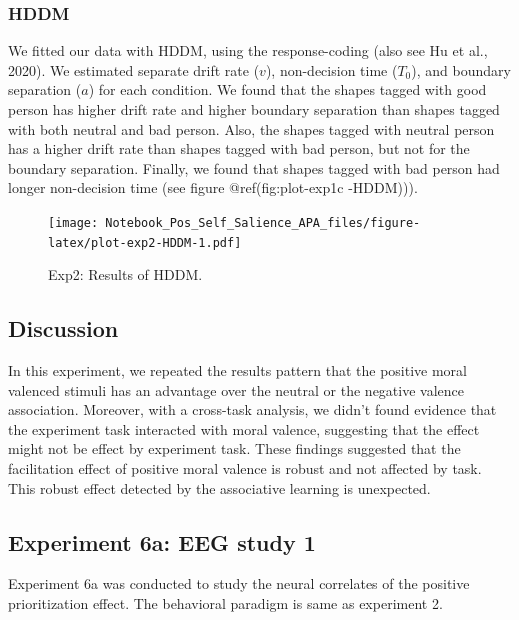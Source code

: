 \documentclass[
  english,
  man]{apa6}
\begin{document}
\hypertarget{hddm-3}{%
\subsubsection{HDDM}\label{hddm-3}}

We fitted our data with HDDM, using the response-coding (also see Hu et al., 2020). We estimated separate drift rate (\(v\)), non-decision time (\(T_{0}\)), and boundary separation (\(a\)) for each condition. We found that the shapes tagged with good person has higher drift rate and higher boundary separation than shapes tagged with both neutral and bad person. Also, the shapes tagged with neutral person has a higher drift rate than shapes tagged with bad person, but not for the boundary separation. Finally, we found that shapes tagged with bad person had longer non-decision time (see figure @ref(fig:plot-exp1c
-HDDM))).

\begin{figure}
\centering
\texttt{[image: Notebook\_Pos\_Self\_Salience\_APA\_files/figure-latex/plot-exp2-HDDM-1.pdf]}
\caption{\label{fig:plot-exp2-HDDM}Exp2: Results of HDDM.}
\end{figure}

\hypertarget{discussion-1}{%
\subsection{Discussion}\label{discussion-1}}

In this experiment, we repeated the results pattern that the positive moral valenced stimuli has an advantage over the neutral or the negative valence association. Moreover, with a cross-task analysis, we didn't found evidence that the experiment task interacted with moral valence, suggesting that the effect might not be effect by experiment task.
These findings suggested that the facilitation effect of positive moral valence is robust and not affected by task. This robust effect detected by the associative learning is unexpected.

\hypertarget{experiment-6a-eeg-study-1}{%
\subsection{Experiment 6a: EEG study 1}\label{experiment-6a-eeg-study-1}}

Experiment 6a was conducted to study the neural correlates of the positive prioritization effect. The behavioral paradigm is same as experiment 2.
\end{document}
